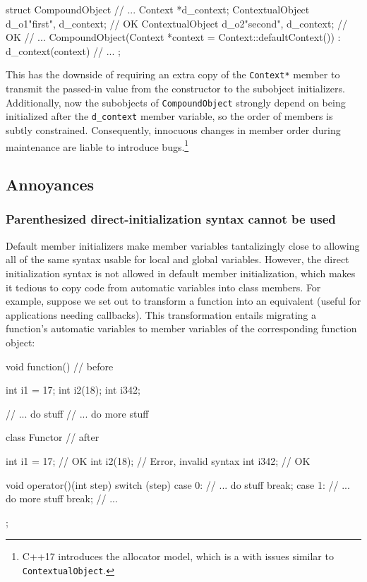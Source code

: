 \begin{emcppslisting}
struct CompoundObject
{
// ...
    Context          *d_context;
    ContextualObject  d_o1{"first", d_context};   // OK
    ContextualObject  d_o2{"second", d_context};  // OK
// ...
    CompoundObject(Context *context = Context::defaultContext())
    : d_context(context)
    { }
// ...
};
\end{emcppslisting}
    

This has the downside of requiring an extra copy of the
\lstinline!Context*! member to transmit the passed-in value from the
constructor to the subobject initializers. Additionally, now the
subobjects of \lstinline!CompoundObject! strongly depend on being
initialized after the \lstinline!d_context! member variable, so the order
of members is subtly constrained. Consequently, innocuous changes in
member order during maintenance are liable to introduce
bugs.{\cprotect\footnote{C++17 introduces the  allocator model, which is a 
  with issues similar to \lstinline!ContextualObject!.}}

\subsection[Annoyances]{Annoyances}\label{annoyances}

\subsubsection[Parenthesized direct-initialization syntax cannot be used]{Parenthesized direct-initialization syntax cannot be used}\label{parenthesized-direct-initialization-syntax-cannot-be-used}

Default member initializers make member variables tantalizingly close to
allowing all of the same syntax usable for local and global variables.
However, the direct initialization syntax is not allowed in default
member initialization, which makes it tedious to copy code from
automatic variables into class members. For example, suppose we set out
to transform a function into an equivalent 
(useful for applications needing callbacks). This transformation entails
migrating a function's automatic variables to member variables of the
corresponding function object:

\begin{emcppslisting}
void function()  // before
{
    int i1 = 17;
    int i2(18);
    int i3{42};

    // ... do stuff
    // ... do more stuff
}

class Functor  // after
{
    int i1 = 17;  // OK
    int i2(18);   // Error, invalid syntax
    int i3{42};   // OK

    void operator()(int step)
    {
       switch (step)
       {
       case 0:  // ... do stuff
           break;
       case 1:  // ... do more stuff
           break;
           // ...
       }
    }
};
\end{emcppslisting}
    

